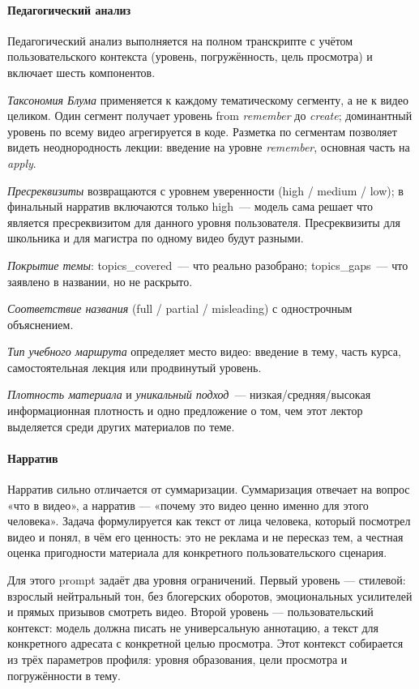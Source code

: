\paragraph{Педагогический анализ}

Педагогический анализ выполняется на полном транскрипте с учётом
пользовательского контекста (уровень, погружённость, цель просмотра)
и включает шесть компонентов.

\textit{Таксономия Блума} \cite{anderson2001taxonomy} применяется
к каждому тематическому сегменту, а не к видео целиком.
Один сегмент получает уровень from \textit{remember} до \textit{create};
доминантный уровень по всему видео агрегируется в коде.
Разметка по сегментам позволяет видеть неоднородность лекции:
введение на уровне \textit{remember}, основная часть на \textit{apply}.

\textit{Пресреквизиты} возвращаются с уровнем уверенности (high / medium / low);
в финальный нарратив включаются только high~--- модель сама решает
что является пресреквизитом для данного уровня пользователя.
Пресреквизиты для школьника и для магистра по одному видео будут разными.

\textit{Покрытие темы}: topics\_covered~--- что реально разобрано;
topics\_gaps~--- что заявлено в названии, но не раскрыто.

\textit{Соответствие названия} (full / partial / misleading)
с однострочным объяснением.

\textit{Тип учебного маршрута} определяет место видео:
введение в тему, часть курса, самостоятельная лекция или продвинутый уровень.

\textit{Плотность материала} и \textit{уникальный подход}~---
низкая/средняя/высокая информационная плотность и одно предложение
о том, чем этот лектор выделяется среди других материалов по теме.

\paragraph{Нарратив}

Нарратив сильно отличается от суммаризации.
Суммаризация отвечает на вопрос «что в видео», а нарратив —
«почему это видео ценно именно для этого человека».
Задача формулируется как текст от лица человека,
который посмотрел видео и понял, в чём его ценность:
это не реклама и не пересказ тем, а честная оценка пригодности материала
для конкретного пользовательского сценария.

Для этого prompt задаёт два уровня ограничений.
Первый уровень — стилевой: взрослый нейтральный тон, без блогерских оборотов,
эмоциональных усилителей и прямых призывов смотреть видео.
Второй уровень — пользовательский контекст: модель должна писать не универсальную
аннотацию, а текст для конкретного адресата с конкретной целью просмотра.
Этот контекст собирается из трёх параметров профиля: уровня образования,
цели просмотра и погружённости в тему.

